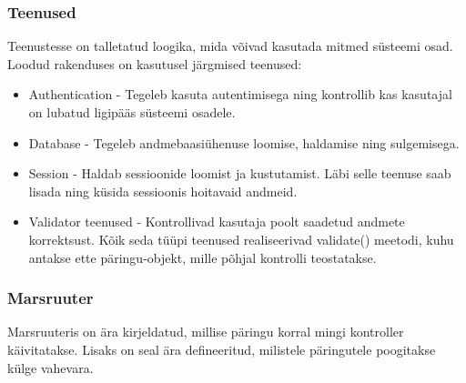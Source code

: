\documentclass[a4paper,12pt]{article} %
\begin{document}
\subsubsection{Teenused}
Teenustesse on talletatud loogika, mida võivad kasutada mitmed süsteemi osad. Loodud rakenduses on kasutusel järgmised teenused:
\begin{itemize}
\item Authentication - Tegeleb kasuta autentimisega ning kontrollib kas kasutajal on lubatud ligipääs süsteemi osadele.
\item Database - Tegeleb andmebaasiühenuse loomise, haldamise ning sulgemisega.
\item Session - Haldab sessioonide loomist ja kustutamist. Läbi selle teenuse saab lisada ning küsida sessioonis hoitavaid andmeid.
\item Validator teenused - Kontrollivad kasutaja poolt saadetud andmete korrektsust. Kõik seda tüüpi teenused realiseerivad validate() meetodi, kuhu antakse ette päringu-objekt, mille põhjal kontrolli teostatakse.
\end{itemize}

\subsubsection{Marsruuter}
Marsruuteris on ära kirjeldatud, millise päringu korral mingi kontroller käivitatakse. Lisaks on seal ära defineeritud, milistele päringutele poogitakse külge vahevara.

\end{document}
